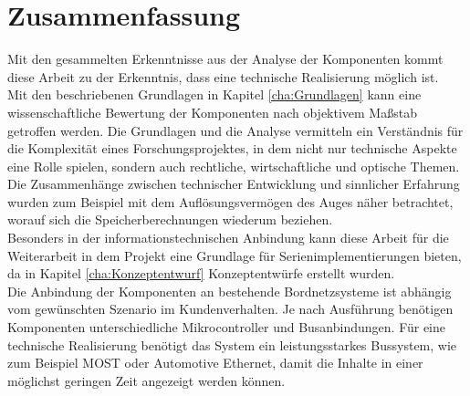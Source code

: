 \chapter{Zusammenfassung}
\label{cha:zusammenfassung}
Mit den gesammelten Erkenntnisse aus der Analyse der Komponenten kommt diese Arbeit zu der Erkenntnis, dass eine technische Realisierung möglich ist. \\
Mit den beschriebenen Grundlagen in Kapitel \ref{cha:Grundlagen} kann eine wissenschaftliche Bewertung der Komponenten nach objektivem Maßstab getroffen werden. Die Grundlagen und die Analyse vermitteln ein Verständnis für die Komplexität eines Forschungsprojektes, in dem nicht nur technische Aspekte eine Rolle spielen, sondern auch rechtliche, wirtschaftliche und optische Themen. \\
Die Zusammenhänge zwischen technischer Entwicklung und sinnlicher Erfahrung wurden zum Beispiel mit dem Auflösungsvermögen des Auges näher betrachtet, worauf sich die Speicherberechnungen wiederum beziehen. \\
Besonders in der informationstechnischen Anbindung kann diese Arbeit für die Weiterarbeit in dem Projekt eine Grundlage für Serienimplementierungen bieten, da in Kapitel \ref{cha:Konzeptentwurf} Konzeptentwürfe erstellt wurden. \\
Die Anbindung der Komponenten an bestehende Bordnetzsysteme ist abhängig vom gewünschten Szenario im Kundenverhalten. Je nach Ausführung benötigen Komponenten unterschiedliche Mikrocontroller und Busanbindungen.
Für eine technische Realisierung benötigt das System ein leistungsstarkes Bussystem, wie zum Beispiel MOST oder Automotive Ethernet, damit die Inhalte in einer möglichst geringen Zeit angezeigt werden können. 
